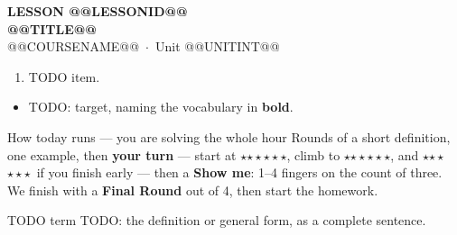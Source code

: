 \documentclass[aspectratio=169, 11pt]{beamer}
\newcommand{\rung}[1]{{\color{goldacc}\ifcase#1\or$\star$\or$\star\star$\or$\star\star\star$\fi}}
\begin{document}
{
\begin{frame}[plain]
  \vspace{2.8cm}\hspace{0.55cm}%
  \begin{minipage}{0.9\textwidth}
    {\color{goldacc}\bfseries\small LESSON @@LESSONID@@}\\[0.5cm]
    {\color{white}\bfseries\LARGE @@TITLE@@}\\[1.2cm]
    {\color{forestmid}\small @@COURSENAME@@~$\cdot$~Unit @@UNITINT@@}
  \end{minipage}
\end{frame}
}

\begin{frame}[t, plain]
  \begin{enumerate}\setlength{\itemsep}{7pt}
    \item TODO item. 
  \end{enumerate}
\end{frame}

\begin{frame}[t, plain]
  \begin{itemize}\setlength{\itemsep}{6pt}
    \item TODO: target, naming the vocabulary in \textbf{bold}.
  \end{itemize}
  \vspace{4pt}
  \begin{block}{How today runs --- you are solving the whole hour}
    Rounds of a short definition, one example, then \textbf{your turn} --- start at \rung1,
    climb to \rung2, and \rung3\ if you finish early --- then a \textbf{Show me}: 1--4 fingers on
    the count of three. We finish with a \textbf{Final Round} out of 4, then start the homework.
  \end{block}
\end{frame}

\begin{frame}[t, plain]
  \begin{block}{TODO term}
    TODO: the definition or general form, as a complete sentence.
  \end{block}
\end{frame}
\end{document}
